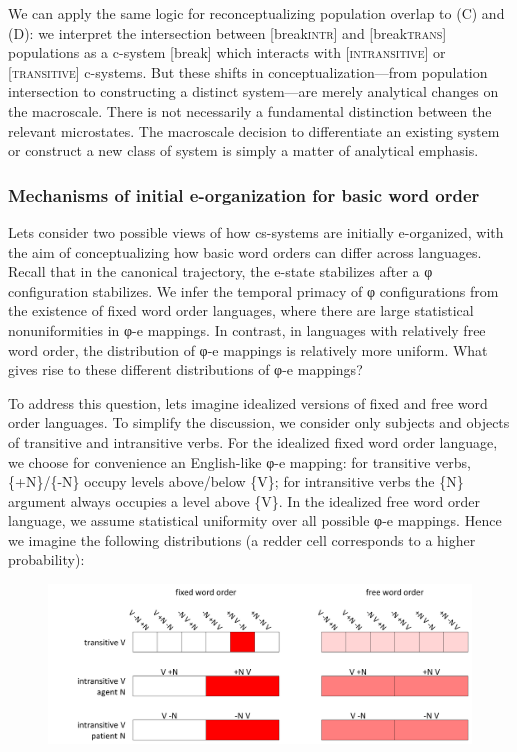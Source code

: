   We can apply the same logic for reconceptualizing population overlap to (C) and (D): we interpret the intersection between [break\textsc{intr}] and [break\textsc{trans}] populations as a c-system [break] which interacts with [\textsc{intransitive}] or [\textsc{transitive}] c-systems. But these shifts in conceptualization—from population intersection to constructing a distinct system—are merely analytical changes on the macroscale. There is not necessarily a fundamental distinction between the relevant microstates. The macroscale decision to differentiate an existing system or construct a new class of system is simply a matter of analytical emphasis.

\subsubsection{Mechanisms of initial e-organization for basic word order}

Lets consider two possible views of how cs-systems are initially e-organized, with the aim of conceptualizing how basic word orders can differ across languages. Recall that in the canonical trajectory, the e-state stabilizes after a φ configuration stabilizes. We infer the temporal primacy of φ configurations from the existence of fixed word order languages, where there are large statistical nonuniformities in φ-e mappings. In contrast, in languages with relatively free word order, the distribution of φ-e mappings is relatively more uniform. What gives rise to these different distributions of φ-e mappings?

  To address this question, lets imagine idealized versions of fixed and free word order languages. To simplify the discussion, we consider only subjects and objects of transitive and intransitive verbs. For the idealized fixed word order language, we choose for convenience an English-like φ-e mapping: for transitive verbs, \{+N\}/\{-N\} occupy levels above/below \{V\}; for intransitive verbs the \{N\} argument always occupies a level above \{V\}. In the idealized free word order language, we assume statistical uniformity over all possible φ-e mappings. Hence we imagine the following distributions (a redder cell corresponds to a higher probability):

  
\begin{figure}
\includegraphics[width=\textwidth]{figures/Tilsen-img74.png}
\caption{\missingcaption}
\label{fig:}
\end{figure}
 

